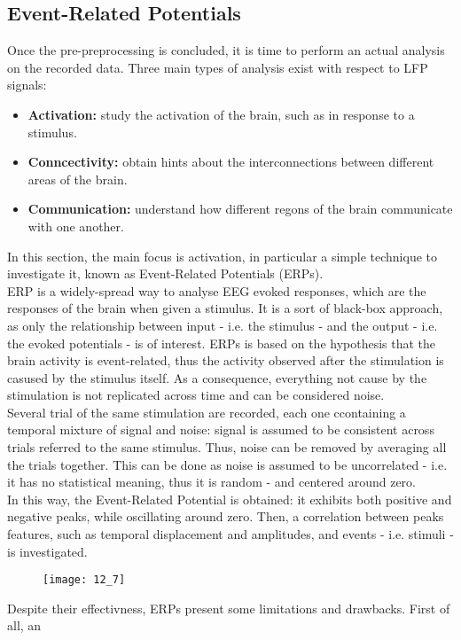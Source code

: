 \subsection{Event-Related Potentials}
Once the pre-preprocessing is concluded, it is time to perform an actual analysis on the
recorded data. Three main types of analysis exist with respect to LFP signals:
\begin{itemize}
    \item \textbf{Activation:} study the activation of the brain, such as in response to a stimulus.
    \item \textbf{Conncectivity:} obtain hints about the interconnections between different
          areas of the brain.
    \item \textbf{Communication:} understand how different regons of the brain communicate
          with one another.
\end{itemize}
In this section, the main focus is activation, in particular a simple technique to investigate
it, known as Event-Related Potentials (ERPs).\\
ERP is a widely-spread way to analyse EEG evoked responses, which are the responses of the brain
when given a stimulus. It is a sort of black-box approach, as only the relationship between
input - i.e. the stimulus - and the output - i.e. the evoked potentials - is of interest.
ERPs is based on the hypothesis that the brain activity is event-related, thus the activity
observed after the stimulation is casused by the stimulus itself. As a consequence, everything
not cause by the stimulation is not replicated across time and can be considered noise.\\
Several trial of the same stimulation are recorded, each one ccontaining a temporal mixture
of signal and noise: signal is assumed to be consistent across trials referred to the same
stimulus. Thus, noise can be removed by averaging all the trials together. This can be done
as noise is assumed to be uncorrelated - i.e. it has no statistical meaning, thus it is random -
and centered around zero.\\
In this way, the Event-Related Potential is obtained: it exhibits both positive and negative
peaks, while oscillating around zero. Then, a correlation between peaks features, such
as temporal displacement and amplitudes, and events - i.e. stimuli - is investigated.
\begin{figure}[H]
    \centering
    \texttt{[image: 12\_7]}
\end{figure}
Despite their effectivness, ERPs present some limitations and drawbacks. First of all, an
